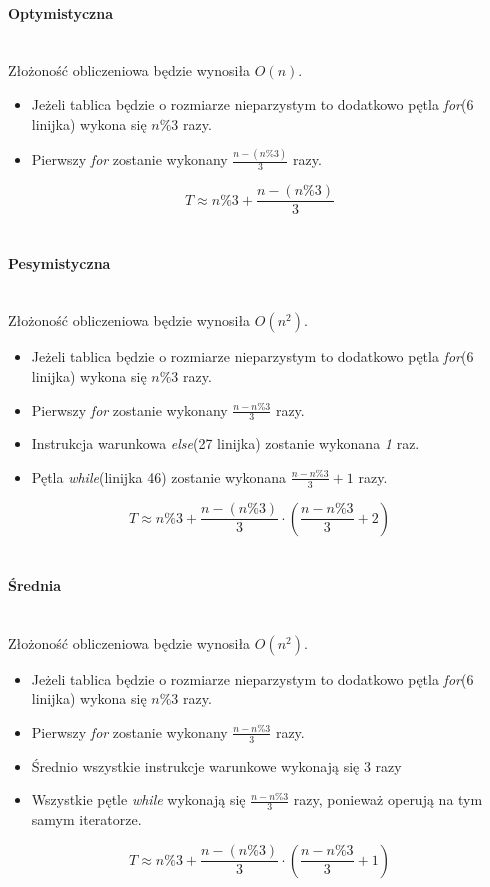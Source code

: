 \paragraph{Optymistyczna}\mbox{}\\

Złożoność obliczeniowa będzie wynosiła $O(n)$.

\begin{itemize}
\item Jeżeli tablica będzie o rozmiarze nieparzystym to dodatkowo pętla \textit{for}(6 linijka) wykona się $n\%3$ razy.
\item Pierwszy \textit{for} zostanie wykonany $\frac{n-(n\%3)}{3} $ razy.
\end{itemize}
\begin{equation*}
T \approx n\%3+\frac{n-(n\%3)}{3}
\end{equation*}
\wyjT\\
\paragraph{Pesymistyczna}\mbox{}\\
Złożoność obliczeniowa będzie wynosiła $O(n^2)$.

\begin{itemize}

\item Jeżeli tablica będzie o rozmiarze nieparzystym to dodatkowo pętla \textit{for}(6 linijka) wykona się $n\%3$ razy.
\item Pierwszy \textit{for} zostanie wykonany $\frac{n-n\%3}{3}$ razy.
\item Instrukcja warunkowa \textit{else}(27 linijka) zostanie wykonana \textit{1} raz.
\item Pętla \textit{while}(linijka 46) zostanie wykonana $\frac{n-n\%3}{3} +1$  razy.
\end{itemize}
\begin{equation*}
T \approx n\%3 + \frac{n-(n\%3)}{3} \cdot(\frac{n-n\%3}{3} +2)
\end{equation*}
\wyjT\\


\paragraph{Średnia}\mbox{}\\
Złożoność obliczeniowa będzie wynosiła $O(n^2)$.
\begin{itemize}

\item Jeżeli tablica będzie o rozmiarze nieparzystym to dodatkowo pętla \textit{for}(6 linijka) wykona się $n\%3$ razy.
\item Pierwszy \textit{for} zostanie wykonany $\frac{n-n\%3}{3}$ razy.
\item Średnio wszystkie instrukcje warunkowe wykonają się $3$ razy
\item Wszystkie pętle \textit{while} wykonają się $\frac{n-n\%3}{3}$ razy, ponieważ operują na tym samym iteratorze.
\end{itemize}
\begin{equation*}
T \approx n\%3 + \frac{n-(n\%3)}{3} \cdot(\frac{n-n\%3}{3} +1)
\end{equation*}
\wyjT\\
